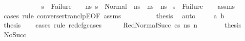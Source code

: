 \begin{isabellebody}
\ \ \ \ \ \ \ \ \ \ \ \ s{\isacharprime}{\kern0pt}{\isacharprime}{\kern0pt}\ {\isasymnoteq}\ Failure\ {\isasymand}\ {\isacharparenleft}{\kern0pt}{\isasymforall}\ \ n{\isacharunderscore}{\kern0pt}s{\isacharprime}{\kern0pt}{\isachardot}{\kern0pt}\ {\isacharparenleft}{\kern0pt}{\isacharparenleft}{\kern0pt}s{\isacharprime}{\kern0pt}{\isacharprime}{\kern0pt}\ {\isacharequal}{\kern0pt}\ {\isacharparenleft}{\kern0pt}Normal\ \ n{\isacharunderscore}{\kern0pt}s{\isacharprime}{\kern0pt}{\isacharparenright}{\kern0pt}{\isacharparenright}{\kern0pt}\ {\isasymlongrightarrow}\ {\isacharparenleft}{\kern0pt}n{\isacharunderscore}{\kern0pt}s{\isacharprime}{\kern0pt}\ {\isacharequal}{\kern0pt}\ n{\isacharunderscore}{\kern0pt}s{\isacharparenright}{\kern0pt}{\isacharparenright}{\kern0pt}{\isacharparenright}{\kern0pt}{\isachardoublequoteclose}\isanewline
{}\ {\isachardoublequoteopen}s{\isacharprime}{\kern0pt}\ {\isasymnoteq}\ Failure{\isachardoublequoteclose}\isanewline
%
\isadelimproof
\ \ %
\endisadelimproof
%
\isatagproof
{}\isamarkupfalse%
\ assms\isanewline
{}\isamarkupfalse%
\ {\isacharparenleft}{\kern0pt}cases\ rule{\isacharcolon}{\kern0pt}\ converse{\isacharunderscore}{\kern0pt}rtranclpE{}{\isacharbrackleft}{\kern0pt}OF\ assms{\isacharparenleft}{\kern0pt}{}{\isacharparenright}{\kern0pt}{\isacharbrackright}{\kern0pt}{\isacharparenright}{\kern0pt}\isanewline
\ \ \isamarkupfalse%
\ {}\isanewline
\ \ \isamarkupfalse%
\ \isamarkupfalse%
\ {\isacharquery}{\kern0pt}thesis\ \isamarkupfalse%
\ auto\isanewline
{}\isamarkupfalse%
\isanewline
\ \ \isamarkupfalse%
\ {\isacharparenleft}{\kern0pt}{}\ a\ b{\isacharparenright}{\kern0pt}\isanewline
\ \ \isamarkupfalse%
\ \isamarkupfalse%
\ {\isacharquery}{\kern0pt}thesis\isanewline
\ \ \isamarkupfalse%
\ {\isacharparenleft}{\kern0pt}cases\ rule{\isacharcolon}{\kern0pt}\ red{\isacharunderscore}{\kern0pt}cfg{\isachardot}{\kern0pt}cases{\isacharparenright}{\kern0pt}\isanewline
\ \ \ \ \isamarkupfalse%
\ {\isacharparenleft}{\kern0pt}RedNormalSucc\ cs\ ns{\isacharprime}{\kern0pt}\ n{\isacharprime}{\kern0pt}{\isacharparenright}{\kern0pt}\isanewline
\ \ \ \ \isamarkupfalse%
\ \isamarkupfalse%
\ {\isacharquery}{\kern0pt}thesis\ \isamarkupfalse%
\ NoSucc\isanewline
\ \ \ \ \ \ \isamarkupfalse%

\end{isabellebody}
